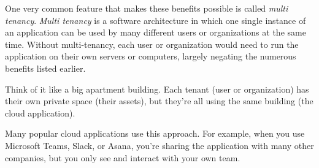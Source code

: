 


One very common feature that makes these benefits possible is called \textit{multi tenancy}.
\textit{Multi tenancy} is a software architecture in which one single instance of an application
can be used by many different users or organizations at the same time. 
Without multi-tenancy, each user or organization would need to run the application on
their own servers or computers, 
largely negating the numerous benefits listed earlier.


Think of it like a big apartment building. Each tenant (user or organization) has their
own private space (their assets), but they're all using the same building (the
cloud application).

Many popular cloud applications use this approach. For example, when you use Microsoft Teams,
Slack, or Asana, you're sharing the application with many other companies, but you only
see and interact with your own team.

